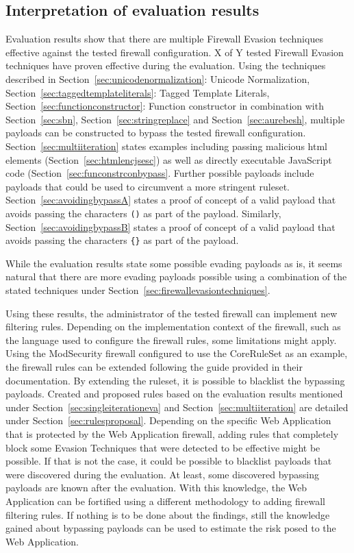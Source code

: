\subsection{Interpretation of evaluation results}
\label{sec:evalinterpretation}
Evaluation results show that there are multiple Firewall Evasion techniques effective against the tested firewall configuration. {\color{red}X of Y} tested Firewall Evasion techniques have proven effective during the evaluation. Using the techniques described in Section~\ref{sec:unicodenormalization}: Unicode Normalization, Section~\ref{sec:taggedtemplateliterals}: Tagged Template Literals, Section~\ref{sec:functionconstructor}: Function constructor in combination with Section~\ref{sec:sbn}, Section~\ref{sec:stringreplace} and Section~\ref{sec:aurebesh}, multiple payloads can be constructed to bypass the tested firewall configuration. Section~\ref{sec:multiiteration} states examples including passing malicious html elements (Section~\ref{sec:htmlencjsesc}) as well as directly executable JavaScript code (Section~\ref{sec:funconstrconbypass}. 
Further possible payloads include payloads that could be used to circumvent a more stringent ruleset.
Section~\ref{sec:avoidingbypassA} states a proof of concept of a valid payload that avoids passing the characters \verb|()| as part of the payload.
Similarly, Section~\ref{sec:avoidingbypassB} states a proof of concept of a valid payload that avoids passing the characters \verb|{}| as part of the payload. 

While the evaluation results state some possible evading payloads as is, it seems natural that there are more evading payloads possible using a combination of the stated techniques under Section~\ref{sec:firewallevasiontechniques}.

Using these results, the administrator of the tested firewall can implement new filtering rules. Depending on the implementation context of the firewall, such as the language used to configure the firewall rules, some limitations might apply. Using the ModSecurity firewall configured to use the CoreRuleSet as an example, the firewall rules can be extended following the guide provided in their documentation. By extending the ruleset, it is possible to blacklist the bypassing payloads. Created and proposed rules based on the evaluation results mentioned under Section~\ref{sec:singleiterationeva} and Section~\ref{sec:multiiteration} are detailed under Section~\ref{sec:rulesproposal}. Depending on the specific Web Application that is protected by the Web Application firewall, adding rules that completely block some Evasion Techniques that were detected to be effective might be possible. If that is not the case, it could be possible to blacklist payloads that were discovered during the evaluation. At least, some discovered bypassing payloads are known after the evaluation. With this knowledge, the Web Application can be fortified using a different methodology to adding firewall filtering rules. If nothing is to be done about the findings, still the knowledge gained about bypassing payloads can be used to estimate the risk posed to the Web Application. 

